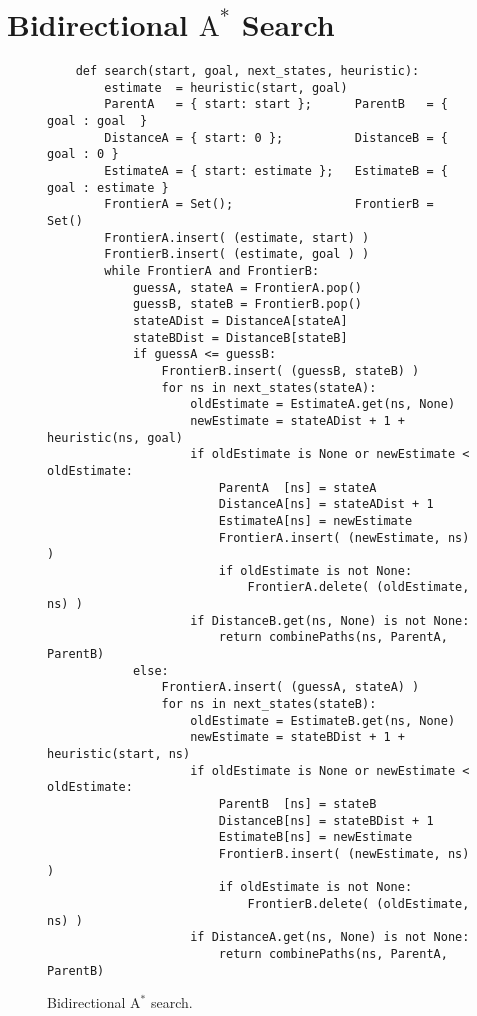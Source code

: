 \section{Bidirectional $\mathrm{A}^*$ Search}
\begin{figure}[!ht]
\centering
\begin{verbatim}
    def search(start, goal, next_states, heuristic):
        estimate  = heuristic(start, goal)
        ParentA   = { start: start };      ParentB   = { goal : goal  }
        DistanceA = { start: 0 };          DistanceB = { goal : 0 }
        EstimateA = { start: estimate };   EstimateB = { goal : estimate }
        FrontierA = Set();                 FrontierB = Set()
        FrontierA.insert( (estimate, start) )
        FrontierB.insert( (estimate, goal ) )
        while FrontierA and FrontierB:
            guessA, stateA = FrontierA.pop()
            guessB, stateB = FrontierB.pop()
            stateADist = DistanceA[stateA]
            stateBDist = DistanceB[stateB]
            if guessA <= guessB:
                FrontierB.insert( (guessB, stateB) )
                for ns in next_states(stateA):
                    oldEstimate = EstimateA.get(ns, None)
                    newEstimate = stateADist + 1 + heuristic(ns, goal)
                    if oldEstimate is None or newEstimate < oldEstimate:
                        ParentA  [ns] = stateA
                        DistanceA[ns] = stateADist + 1
                        EstimateA[ns] = newEstimate
                        FrontierA.insert( (newEstimate, ns) )
                        if oldEstimate is not None:
                            FrontierA.delete( (oldEstimate, ns) )
                    if DistanceB.get(ns, None) is not None:
                        return combinePaths(ns, ParentA, ParentB)
            else:
                FrontierA.insert( (guessA, stateA) )
                for ns in next_states(stateB):
                    oldEstimate = EstimateB.get(ns, None)
                    newEstimate = stateBDist + 1 + heuristic(start, ns)
                    if oldEstimate is None or newEstimate < oldEstimate:
                        ParentB  [ns] = stateB
                        DistanceB[ns] = stateBDist + 1
                        EstimateB[ns] = newEstimate
                        FrontierB.insert( (newEstimate, ns) )
                        if oldEstimate is not None:
                            FrontierB.delete( (oldEstimate, ns) )
                    if DistanceA.get(ns, None) is not None:
                        return combinePaths(ns, ParentA, ParentB)                    
\end{verbatim}
\vspace*{-0.3cm}
\caption{Bidirectional $\mathrm{A}^*$ search.}
\label{fig:Bidirectional-A-Star-Search.ipynb}
\end{figure}
